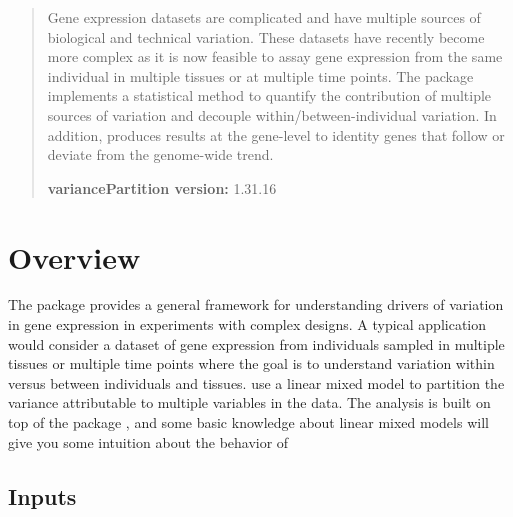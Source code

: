 \documentclass[12pt]{article}\usepackage[]{graphicx}\usepackage[]{xcolor}
\author{Gabriel Hoffman\\ 
\small{Pamela Sklar Division of Psychiatric Genomics} \\
\small{Icahn Institute for Genomics and Multiscale Biology}\\
\small{Department of Genetics and Genomic Sciences}\\
\small{Icahn School of Medicine at Mount Sinai}}
\begin{document}
\maketitle

\begin{abstract}
  \noindent
  Gene expression datasets are complicated and have multiple sources of biological and technical variation.  These datasets have recently become more complex as it is now feasible to assay gene expression from the same individual in multiple tissues or at multiple time points.  The  package implements a statistical method to quantify the contribution of multiple sources of variation and decouple within/between-individual variation.  In addition,  produces results at the gene-level to identity genes that follow or deviate from the genome-wide trend.

  \vspace{2cm}
  \noindent
  \textbf{variancePartition version:} 1.31.16
\end{abstract}
  


\newpage

\tableofcontents

\pagebreak
\section{Overview}

The  package provides a general framework for understanding drivers of variation in gene expression in experiments with complex designs.  A typical application would consider a dataset of gene expression from individuals sampled in multiple tissues or multiple time points where the goal is to understand variation within versus between individuals and tissues.   use a linear mixed model to partition the variance attributable to multiple variables in the data.  The analysis is built on top of the  package \cite{Bates2015}, and some basic knowledge about linear mixed models will give you some intuition about the behavior of  \cite{Pinheiro2000, Galecki2010}


\subsection{Inputs}
\end{document}
